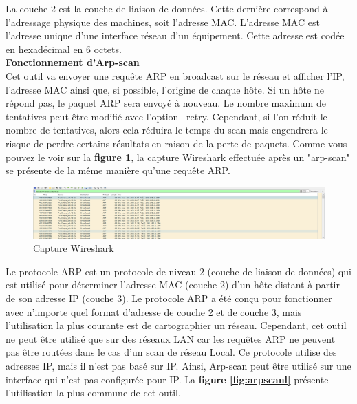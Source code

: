 La couche 2 est la couche de liaison de données. Cette dernière correspond à l’adressage physique des machines, soit l’adresse MAC. L’adresse MAC est l’adresse unique d’une interface réseau d’un équipement. Cette adresse est codée en hexadécimal en 6 octets.\\

 \textbf{Fonctionnement d'Arp-scan}\\

Cet outil va envoyer une requête ARP en broadcast sur le réseau et afficher l’IP, l'adresse MAC ainsi que, si possible, l'origine de chaque hôte. Si un hôte ne répond pas, le paquet ARP sera envoyé à nouveau. Le nombre maximum de tentatives peut être modifié avec l'option --retry. Cependant, si l'on réduit le nombre de tentatives, alors cela réduira le temps du scan mais engendrera le risque de perdre certains résultats en raison de la perte de paquets.
Comme vous pouvez le voir sur la \textbf{figure \ref{fig:arpscanwireshark}}, la capture Wireshark effectuée après un "arp-scan" se présente de la même manière qu’une requête ARP.

\begin{figure}[htp!]
  \centering
  \setlength\figureheight{7cm}
  \setlength\figurewidth{9cm}
  \includegraphics[width=1\textwidth]{oui/images/Arpscan/wireshark.PNG}
  \caption{Capture Wireshark}
  \label{fig:arpscanwireshark}
\end{figure}

Le protocole ARP est un protocole de niveau 2 (couche de liaison de données) qui est utilisé pour déterminer l'adresse MAC (couche 2) d'un hôte distant à partir de son adresse IP (couche 3). Le protocole ARP a été conçu pour fonctionner avec n'importe quel format d'adresse de couche 2 et de couche 3, mais l'utilisation la plus courante est de cartographier un réseau.
Cependant, cet outil ne peut être utilisé que sur des réseaux LAN car les requêtes ARP ne peuvent pas être routées dans le cas d’un scan de réseau Local.
Ce protocole utilise des adresses IP, mais il n'est pas basé sur IP. Ainsi, Arp-scan peut être utilisé sur une interface qui n'est pas configurée pour IP. La \textbf{figure \ref{fig:arpscanl}} présente l'utilisation la plus commune de cet outil.

